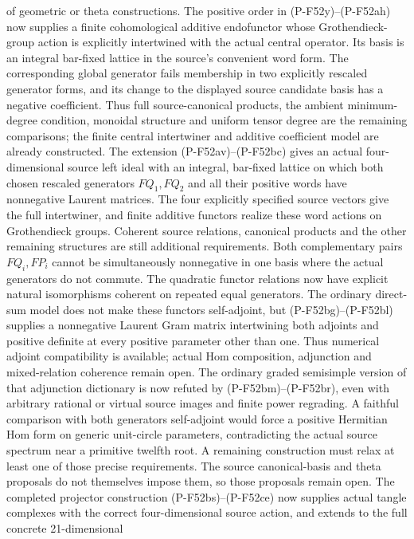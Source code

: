 \begin{description}
of geometric or theta constructions.
The positive order in (P-F52y)--(P-F52ah) now supplies a finite
cohomological additive endofunctor whose Grothendieck-group action
is explicitly intertwined with the actual central operator.
Its basis is an integral bar-fixed lattice in the source's
convenient word form. The corresponding global generator fails
membership in two explicitly rescaled generator forms, and its
change to the displayed source candidate basis has a negative
coefficient. Thus full source-canonical products, the ambient
minimum-degree condition, monoidal structure and uniform tensor
degree are the remaining comparisons; the finite central
intertwiner and additive coefficient model are already constructed.
The extension (P-F52av)--(P-F52bc) gives an actual
four-dimensional source left ideal with an integral, bar-fixed
lattice on which both chosen rescaled generators $FQ_1,FQ_2$
and all their positive words have nonnegative Laurent matrices.
The four explicitly specified source vectors give the full
intertwiner, and finite additive functors realize these word
actions on Grothendieck groups. Coherent source relations,
canonical products and the other remaining structures are
still additional requirements. Both complementary pairs
$FQ_i,FP_i$ cannot be simultaneously nonnegative in one
basis where the actual generators do not commute.
The quadratic functor relations now have explicit natural
isomorphisms coherent on repeated equal generators.
The ordinary direct-sum model does not make these functors
self-adjoint, but (P-F52bg)--(P-F52bl) supplies a nonnegative
Laurent Gram matrix intertwining both adjoints and positive
definite at every positive parameter other than one. Thus
numerical adjoint compatibility is available; actual Hom
composition, adjunction and mixed-relation coherence remain open.
The ordinary graded semisimple version of that adjunction
dictionary is now refuted by (P-F52bm)--(P-F52br), even
with arbitrary rational or virtual source images and finite
power regrading. A faithful comparison with both generators
self-adjoint would force a positive Hermitian Hom form on
generic unit-circle parameters, contradicting the actual
source spectrum near a primitive twelfth root. A remaining
construction must relax at least one of those precise
requirements. The source canonical-basis and theta proposals
do not themselves impose them, so those proposals remain open.
The completed projector construction (P-F52bs)--(P-F52ce)
now supplies actual tangle complexes with the correct four-dimensional
source action, and extends to the full concrete 21-dimensional

\end{description}
